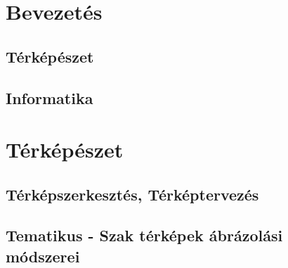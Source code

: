 \documentclass[11pt,twoside,a4paper,final]{report}
\begin{document}
\newpage

\pagestyle{plain}

\tableofcontents



\newpage


\chapter{Bevezetés}
\label{ch:bevezetés}
	\section{Térképészet}
	\label{ch:térkép}
	
	\section{Informatika}
	\label{ch:informatika}

\chapter{Térképészet}
\label{sec:térképészet}
	\section{Térképszerkesztés, Térképtervezés}
	\label{sec:szerkesztés,tervezés}
	
	\section{Tematikus - Szak térképek ábrázolási módszerei}
	\label{sec:tematikus,szak,térkép,ábrázolás}
\end{document}
